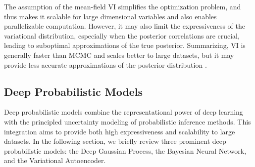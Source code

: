 The assumption of the mean-field \ac{VI} simplifies the optimization problem, and thus makes it scalable for large dimensional variables and also enables parallelizable computation. However, it may also limit the expressiveness of the variational distribution, especially when the posterior correlations are crucial, leading to suboptimal approximations of the true posterior. Summarizing, \ac{VI} is generally faster than \ac{MCMC} and scales better to large datasets, but it may provide less accurate approximations of the posterior distribution \citep{Blei_2017}. 

\subsection{Deep Probabilistic Models}
Deep probabilistic models combine the representational power of deep learning with the principled uncertainty modeling of probabilistic inference methods. This integration aims to provide both high expressiveness and scalability to large datasets. In the following section, we briefly review three prominent deep probabilistic models: the Deep Gaussian Process, the Bayesian Neural Network, and the Variational Autoencoder.

